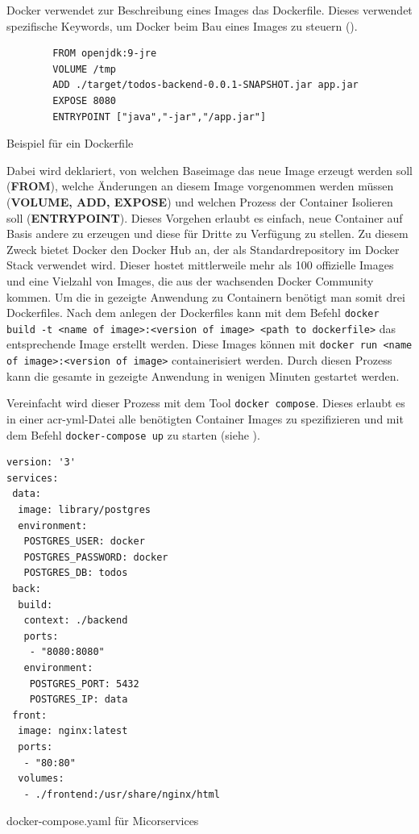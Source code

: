 Docker verwendet zur Beschreibung eines Images das Dockerfile. Dieses verwendet spezifische Keywords, um Docker beim Bau eines Images zu steuern ().

\begin{listing}[h]
	\begin{verbatim}
		FROM openjdk:9-jre
		VOLUME /tmp
		ADD ./target/todos-backend-0.0.1-SNAPSHOT.jar app.jar
		EXPOSE 8080
		ENTRYPOINT ["java","-jar","/app.jar"]
	\end{verbatim}
	\caption{Beispiel für ein Dockerfile}
	\label{lst:dockerfileExmpl}
\end{listing}

Dabei wird deklariert, von welchen Baseimage das neue Image erzeugt werden soll (\textbf{FROM}), welche Änderungen an diesem Image vorgenommen werden müssen (\textbf{VOLUME, ADD, EXPOSE}) und welchen Prozess der Container Isolieren soll (\textbf{ENTRYPOINT}). Dieses Vorgehen erlaubt es einfach, neue Container auf Basis andere zu erzeugen und diese für Dritte zu Verfügung zu stellen. Zu diesem Zweck bietet Docker den Docker Hub an, der als Standardrepository im Docker Stack verwendet wird. Dieser hostet mittlerweile mehr als 100 offizielle Images und eine Vielzahl von Images, die aus der wachsenden Docker Community kommen. Um die in  gezeigte Anwendung zu Containern benötigt man somit drei Dockerfiles. Nach dem anlegen der Dockerfiles kann mit dem Befehl \texttt{docker build -t <name of image>:<version of image> <path to dockerfile>} das entsprechende Image erstellt werden. Diese Images können mit \texttt{docker run <name of image>:<version of image>} containerisiert werden. Durch diesen Prozess kann die gesamte in  gezeigte Anwendung in wenigen Minuten gestartet werden.

Vereinfacht wird dieser Prozess mit dem Tool \texttt{docker compose}. Dieses erlaubt es in einer \gls{acr-yml}-Datei alle benötigten Container Images zu spezifizieren und mit dem Befehl \texttt{docker-compose up} zu starten (siehe ).

\begin{listing}[h]
	\begin{verbatim}
version: '3'
services:
 data:
  image: library/postgres
  environment:
   POSTGRES_USER: docker
   POSTGRES_PASSWORD: docker
   POSTGRES_DB: todos
 back:
  build:
   context: ./backend
   ports:
    - "8080:8080"
   environment:
    POSTGRES_PORT: 5432
    POSTGRES_IP: data
 front:
  image: nginx:latest
  ports:
   - "80:80"
  volumes:
   - ./frontend:/usr/share/nginx/html
	\end{verbatim}
	\caption{docker-compose.yaml für Micorservices}
	\label{lst:dockerComposeTodos}
\end{listing}

